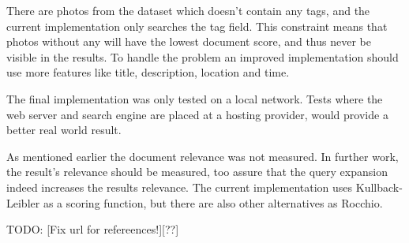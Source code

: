 There are photos from the dataset which doesn't contain any tags,
and the current implementation only searches the tag field.
This constraint means that photos without any will have the lowest document score, and thus never be visible in the results.
To handle the problem an improved implementation should use more features like title, description, location and time.

The final implementation was only tested on a local network.
Tests where the web server and search engine are placed at a hosting provider,
would provide a better real world result.

As mentioned earlier the document relevance was not measured.
In further work, the result's relevance should be measured, too assure that the query expansion indeed increases the results relevance.
The current implementation uses Kullback-Leibler as a scoring function, but there are also other alternatives as Rocchio.


TODO: [Fix url for refereences!][??]

